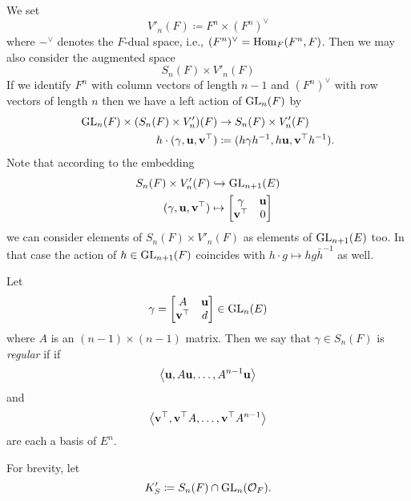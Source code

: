 \begin{definition}
  We set
  \[ V'_n(F) \coloneqq F^n \times (F^n)^\vee \]
  where $-^\vee$ denotes the $F$-dual space, i.e., $(F^n)^\vee = \operatorname{Hom}_F(F^n, F)$.
  Then we may also consider the augmented space
  \[ S_n(F) \times V'_n(F) \]
  If we identify $F^n$ with column vectors of length $n-1$ and $(F^n)^\vee$
  with row vectors of length $n$ then we have a left action of $\operatorname{GL}_n(F)$ by
  \begin{align*}
    \operatorname{GL}_n(F) \times (S_n(F) \times V'_n)(F)
    &\to S_n(F) \times V'_n(F) \\
    h \cdot (\gamma, \mathbf u, \mathbf v^\top)
    &\coloneqq (h \gamma h^{-1}, h\mathbf u, \mathbf v^\top h^{-1}).
  \end{align*}
  Note that according to the embedding
  \begin{align*}
    S_n(F) \times V'_n(F)
    &\hookrightarrow \operatorname{GL}_{n+1}(E) \\
    (\gamma, \mathbf u, \mathbf v^\top)
    &\mapsto \begin{bmatrix} \gamma & \mathbf u \\ \mathbf v^\top & 0 \end{bmatrix}
  \end{align*}
  we can consider elements of $S_n(F) \times V'_n(F)$ as elements of $\operatorname{GL}_{n+1}(E)$ too.
  In that case the action of $h \in \operatorname{GL}_{n+1}(F)$
  coincides with $h \cdot g \mapsto hg\bar{h}^{-1}$ as well.
\end{definition}

\begin{definition}
  Let \[ \gamma = \begin{bmatrix} A & \mathbf u \\ \mathbf v^\top & d \end{bmatrix} \in \operatorname{GL}_n(E) \]
  where $A$ is an $(n-1) \times (n-1)$ matrix.
  Then we say that $\gamma \in S_n(F)$ is \emph{regular} if
  if \[ \left< \mathbf u, A\mathbf u, \dots, A^{n-1}\mathbf u \right> \]
  and \[ \left< \mathbf v^\top, \mathbf v^\top A, \dots, \mathbf v^\top A^{n-1} \right> \]
  are each a basis of $E^n$.
  \label{def:regular}
\end{definition}

\begin{definition}
  For brevity, let
   \[ K'_S \coloneqq S_n(F) \cap \operatorname{GL}_n(\mathcal O_F). \]
\end{definition}

